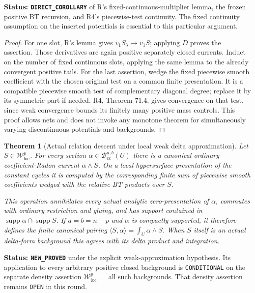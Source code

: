 \documentclass[11pt,a4paper]{article}
\numberwithin{equation}{section}
\newtheorem{theorem}{Theorem}[section]
\theoremstyle{definition}
\theoremstyle{remark}
\begin{document}
\noindent\textbf{Status: \texttt{DIRECT\_COROLLARY}} of R's
fixed-continuous-multiplier lemma, the frozen positive BT
recursion, and R4's piecewise-test continuity. The fixed
continuity assumption on the inserted potentials is
essential to this particular argument.

\begin{proof}
For one slot, R's lemma gives $v_1S_\lambda\to v_1S$;
applying $D$ proves the assertion. Those derivatives are
again positive separately closed currents. Induct on the
number of fixed continuous slots, applying the same lemma
to the already convergent positive tails. For the last
assertion, wedge the fixed piecewise smooth coefficient
with the chosen original test on a common finite
presentation. It is a compatible piecewise smooth test
of complementary diagonal degree; replace it by its
symmetric part if needed. R4, Theorem 71.4, gives
convergence on that test, since weak convergence bounds
its finitely many positive mass controls. This proof
allows nets and does not invoke any monotone theorem
for simultaneously varying discontinuous potentials and
backgrounds.
\end{proof}

\begin{theorem}[Actual relation descent under local weak delta approximation]
\label{thm:r6-weak-delta-actual-descent}
Let $S\in\mathcal W^p_{\mathrm{loc}}$. For every section
$\alpha\in\mathscr B_{\mathrm{cc}}^{a,b}(U)$ there is a
canonical ordinary coefficient-Radon current
$\alpha\wedge S$. On a local hypersurface presentation of
the constant cycles it is computed by the corresponding
finite sum of piecewise smooth coefficients wedged with
the relative BT products over $S$.

This operation annihilates every actual analytic
zero-presentation of $\alpha$, commutes with ordinary
restriction and gluing, and has support contained in
$\operatorname{supp}\alpha\cap\operatorname{supp}S$.
If $a=b=n-p$ and $\alpha$ is compactly supported, it
therefore defines the finite canonical pairing
$\langle S,\alpha\rangle=\int_U\alpha\wedge S$.
When $S$ itself is an actual delta-form background this
agrees with its delta product and integration.
\end{theorem}

\noindent\textbf{Status: \texttt{NEW\_PROVED}} under the
explicit weak-approximation hypothesis. Its application
to every arbitrary positive closed background is
\texttt{CONDITIONAL} on the separate density assertion
$\mathcal W^p_{\mathrm{loc}}=$ all such backgrounds.
That density assertion remains \texttt{OPEN} in this round.
\end{document}
